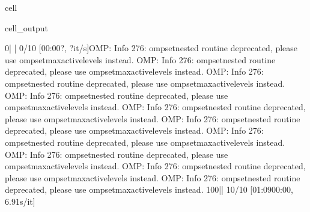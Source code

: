 \documentclass[letterpaper,table,10pt,english]{jupyterBook}
\begin{document}
\begin{sphinxuseclass}{cell}
\begin{sphinxVerbatimOutput}
\begin{sphinxuseclass}{cell_output}
\begin{sphinxVerbatim}[commandchars=\\\{\}]
  0\PYGZpc{}|                                                                                                                                            | 0/10 [00:00\PYGZlt{}?, ?it/s]OMP: Info \PYGZsh{}276: omp\PYGZus{}set\PYGZus{}nested routine deprecated, please use omp\PYGZus{}set\PYGZus{}max\PYGZus{}active\PYGZus{}levels instead.
OMP: Info \PYGZsh{}276: omp\PYGZus{}set\PYGZus{}nested routine deprecated, please use omp\PYGZus{}set\PYGZus{}max\PYGZus{}active\PYGZus{}levels instead.
OMP: Info \PYGZsh{}276: omp\PYGZus{}set\PYGZus{}nested routine deprecated, please use omp\PYGZus{}set\PYGZus{}max\PYGZus{}active\PYGZus{}levels instead.
OMP: Info \PYGZsh{}276: omp\PYGZus{}set\PYGZus{}nested routine deprecated, please use omp\PYGZus{}set\PYGZus{}max\PYGZus{}active\PYGZus{}levels instead.
OMP: Info \PYGZsh{}276: omp\PYGZus{}set\PYGZus{}nested routine deprecated, please use omp\PYGZus{}set\PYGZus{}max\PYGZus{}active\PYGZus{}levels instead.
OMP: Info \PYGZsh{}276: omp\PYGZus{}set\PYGZus{}nested routine deprecated, please use omp\PYGZus{}set\PYGZus{}max\PYGZus{}active\PYGZus{}levels instead.
OMP: Info \PYGZsh{}276: omp\PYGZus{}set\PYGZus{}nested routine deprecated, please use omp\PYGZus{}set\PYGZus{}max\PYGZus{}active\PYGZus{}levels instead.
OMP: Info \PYGZsh{}276: omp\PYGZus{}set\PYGZus{}nested routine deprecated, please use omp\PYGZus{}set\PYGZus{}max\PYGZus{}active\PYGZus{}levels instead.
OMP: Info \PYGZsh{}276: omp\PYGZus{}set\PYGZus{}nested routine deprecated, please use omp\PYGZus{}set\PYGZus{}max\PYGZus{}active\PYGZus{}levels instead.
OMP: Info \PYGZsh{}276: omp\PYGZus{}set\PYGZus{}nested routine deprecated, please use omp\PYGZus{}set\PYGZus{}max\PYGZus{}active\PYGZus{}levels instead.
100\PYGZpc{}|\PYGZsh{}\PYGZsh{}\PYGZsh{}\PYGZsh{}\PYGZsh{}\PYGZsh{}\PYGZsh{}\PYGZsh{}\PYGZsh{}\PYGZsh{}\PYGZsh{}\PYGZsh{}\PYGZsh{}\PYGZsh{}\PYGZsh{}\PYGZsh{}\PYGZsh{}\PYGZsh{}\PYGZsh{}\PYGZsh{}\PYGZsh{}\PYGZsh{}\PYGZsh{}\PYGZsh{}\PYGZsh{}\PYGZsh{}\PYGZsh{}\PYGZsh{}\PYGZsh{}\PYGZsh{}\PYGZsh{}\PYGZsh{}\PYGZsh{}\PYGZsh{}\PYGZsh{}\PYGZsh{}\PYGZsh{}\PYGZsh{}\PYGZsh{}\PYGZsh{}\PYGZsh{}\PYGZsh{}\PYGZsh{}\PYGZsh{}\PYGZsh{}\PYGZsh{}\PYGZsh{}\PYGZsh{}\PYGZsh{}\PYGZsh{}\PYGZsh{}\PYGZsh{}\PYGZsh{}\PYGZsh{}\PYGZsh{}\PYGZsh{}\PYGZsh{}\PYGZsh{}\PYGZsh{}\PYGZsh{}\PYGZsh{}\PYGZsh{}\PYGZsh{}\PYGZsh{}\PYGZsh{}\PYGZsh{}\PYGZsh{}\PYGZsh{}\PYGZsh{}\PYGZsh{}\PYGZsh{}\PYGZsh{}\PYGZsh{}\PYGZsh{}\PYGZsh{}\PYGZsh{}\PYGZsh{}\PYGZsh{}\PYGZsh{}\PYGZsh{}\PYGZsh{}\PYGZsh{}\PYGZsh{}\PYGZsh{}\PYGZsh{}\PYGZsh{}\PYGZsh{}\PYGZsh{}\PYGZsh{}\PYGZsh{}\PYGZsh{}\PYGZsh{}\PYGZsh{}\PYGZsh{}\PYGZsh{}\PYGZsh{}\PYGZsh{}\PYGZsh{}\PYGZsh{}\PYGZsh{}\PYGZsh{}\PYGZsh{}\PYGZsh{}\PYGZsh{}\PYGZsh{}\PYGZsh{}\PYGZsh{}\PYGZsh{}\PYGZsh{}\PYGZsh{}\PYGZsh{}\PYGZsh{}\PYGZsh{}\PYGZsh{}\PYGZsh{}\PYGZsh{}\PYGZsh{}\PYGZsh{}\PYGZsh{}\PYGZsh{}\PYGZsh{}\PYGZsh{}\PYGZsh{}\PYGZsh{}\PYGZsh{}\PYGZsh{}\PYGZsh{}\PYGZsh{}\PYGZsh{}\PYGZsh{}\PYGZsh{}| 10/10 [01:09\PYGZlt{}00:00,  6.91s/it]
\end{sphinxVerbatim}


\end{sphinxuseclass}
\end{sphinxVerbatimOutput}
\end{sphinxuseclass}
\end{document}
